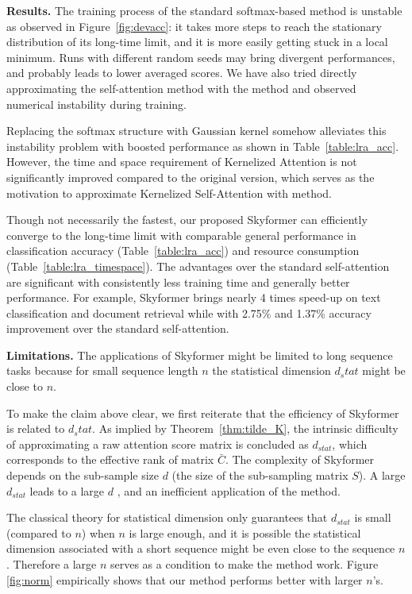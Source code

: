 \textbf{Results.}
The training process of the standard softmax-based method is unstable as observed in Figure~\ref{fig:devacc}: it takes more steps to reach the stationary distribution of its long-time limit, and it is more easily getting stuck in a local minimum. 
Runs with different random seeds may bring divergent performances, and probably leads to lower averaged scores.
We have also tried directly approximating the self-attention method with the \nystrom method and observed numerical instability during training.

Replacing the softmax structure with Gaussian kernel somehow alleviates this instability problem with boosted performance as shown in Table~\ref{table:lra_acc}. 
However, the time and space requirement of Kernelized Attention is not significantly improved compared to the original version, which serves as the motivation to approximate Kernelized Self-Attention with \nystrom method.

Though not necessarily the fastest, our proposed Skyformer can efficiently converge to the long-time limit with comparable general performance in classification accuracy (Table~\ref{table:lra_acc}) and resource consumption (Table~\ref{table:lra_timespace}).
The advantages over the standard self-attention are significant with consistently less training time and generally better performance.
For example, Skyformer brings nearly 4 times speed-up on text classification and document retrieval while with 2.75\% and 1.37\% accuracy improvement over the standard self-attention.


\textbf{Limitations.}
The applications of Skyformer might be limited to long sequence tasks because for small sequence length $n$ the statistical dimension $d_stat$ might be close to $n$.

To make the claim above clear, we first reiterate that the efficiency of Skyformer is related to $d_stat$.
As implied by Theorem~\ref{thm:tilde_K}, the intrinsic difficulty of approximating a raw attention score matrix is concluded as $d_{stat}$, which corresponds to the effective rank of matrix $\bar{C}$. 
The complexity of Skyformer depends on the sub-sample size $d$ (the size of the sub-sampling matrix $S$). A large $d_{stat}$ leads to a large $d$ , and an inefficient application of the \nystrom method. 

The classical theory for statistical dimension only guarantees that $d_{stat}$ is small (compared to $n$) when $n$ is large enough, and it is possible the statistical dimension associated with a short sequence might be even close to the sequence $n$. 
Therefore a large $n$ serves as a condition to make the method work. 
Figure \ref{fig:norm} empirically shows that our method performs better with larger $n$’s. 








